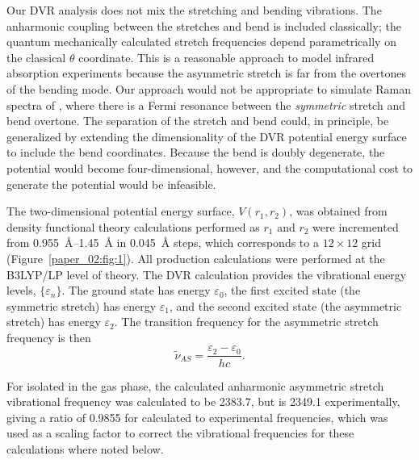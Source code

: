 \documentclass[%
  class = book,%
  crop = false,%
  float = true,%
  multi = true,%
  preview = false,%
]{standalone}
\begin{document}
Our DVR analysis does not mix the stretching and bending vibrations. The anharmonic coupling between the stretches and bend is included classically; the quantum mechanically calculated stretch frequencies depend parametrically on the classical \(\theta\) coordinate. This is a reasonable approach to model infrared absorption experiments because the asymmetric stretch is far from the overtones of the bending mode. Our approach would not be appropriate to simulate Raman spectra of , where there is a Fermi resonance between the \emph{symmetric} stretch and bend overtone. The separation of the stretch and bend could, in principle, be generalized by extending the dimensionality of the DVR potential energy surface to include the bend coordinates. Because the bend is doubly degenerate, the potential would become four-dimensional, however, and the computational cost to generate the potential would be infeasible.

The two-dimensional potential energy surface, \(V\left(r_1,r_2\right)\), was obtained from density functional theory calculations performed as \(r_1\) and \(r_2\) were incremented from \SIrange{0.955}{1.45}{\angstrom} in \SI{0.045}{\angstrom} steps, which corresponds to a \(12 \times 12\) grid (Figure~\ref{paper_02:fig:1}). All production calculations were performed at the B3LYP/LP level of theory. The DVR calculation provides the vibrational energy levels, \(\{\varepsilon_{n}\}\). The ground state has energy \(\varepsilon_{0}\), the first excited state (the symmetric stretch) has energy \(\varepsilon_{1}\), and the second excited state (the asymmetric stretch) has energy \(\varepsilon_{2}\). The transition frequency for the asymmetric stretch frequency is then
\begin{equation}
  \label{paper_02:eq:2}
  \widetilde{\nu}_{AS} = \frac{\varepsilon_{2} - \varepsilon_{0}}{hc}.
\end{equation}

For  isolated in the gas phase, the calculated anharmonic asymmetric stretch vibrational frequency was calculated to be \SI{2383.7}{\wavenumber}, but is \SI{2349.1}{\wavenumber} experimentally, giving a ratio of \num{0.9855} for calculated to experimental frequencies, which was used as a scaling factor to correct the vibrational frequencies for these calculations where noted below.
\end{document}
